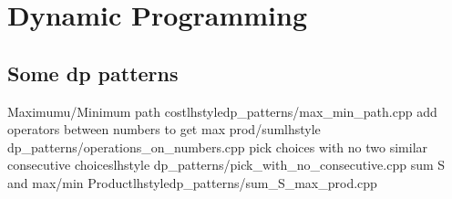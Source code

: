 \section{Dynamic Programming}
  \subsection{Some dp patterns}
        {Maximumu/Minimum path cost}{lhstyle}{dp_patterns/max_min_path.cpp}
        {add operators between numbers to get max prod/sum}{lhstyle} {dp_patterns/operations_on_numbers.cpp}
        {pick choices with no two similar consecutive choices}{lhstyle} {dp_patterns/pick_with_no_consecutive.cpp}
        {sum S and max/min Product}{lhstyle}{dp_patterns/sum_S_max_prod.cpp}
